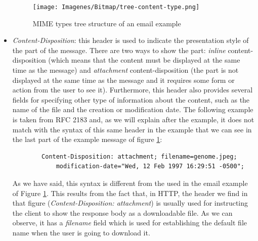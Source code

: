 \begin{itemize}
	\begin{figure}[t]
		\centering%
		\texttt{[image: Imagenes/Bitmap/tree-content-type.png]}%
		\caption{MIME types tree structure of an email example}%
		\label{fig:content-type}
	\end{figure}
	\item\textit{Content-Disposition}: this header is used to indicate the presentation style of the part of the message. There are two ways to show the part: \textit{inline} content-disposition (which means that the content must be displayed at the same time as the message) and \textit{attachment} content-disposition (the part is not displayed at the same time as the message and it requires some form or action from the user to see it). Furthermore, this header also provides several fields for specifying other type of information about the content, such as the name of the file and the creation or modification date. The following example is taken from RFC 2183 \citep{rfc2183} and, as we will explain after the example, it does not match with the syntax of this same header in the example that we can see in the last part of the example message of figure \ref{fig:content-type}:
	\begin{lstlisting}
		Content-Disposition: attachment; filename=genome.jpeg;
			modification-date="Wed, 12 Feb 1997 16:29:51 -0500";
	\end{lstlisting}
	As we have said, this syntax is different from the used in the email example of Figure \ref{fig:content-type}. This results from the fact that, in HTTP, the header we find in that figure (\textit{Content-Disposition: attachment}) is usually used for instructing the client to show the response body as a downloadable file. As we can observe, it has a \textit{filename} field which is used for establishing the default file name when the user is going to download it.
	

\end{itemize}
